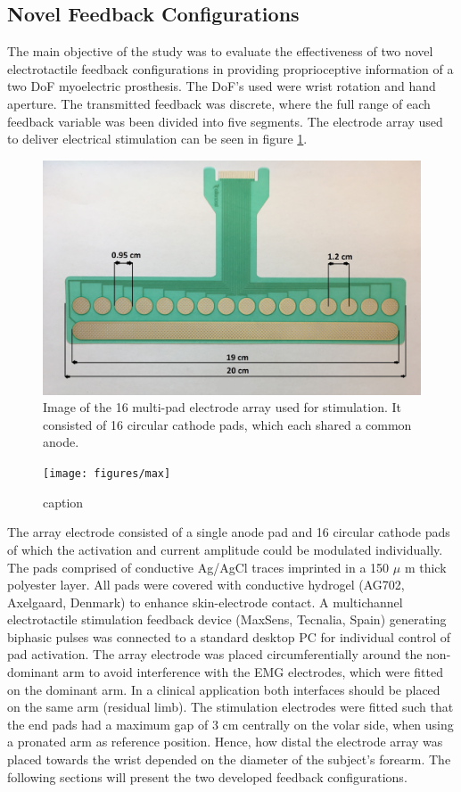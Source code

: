 \subsection{Novel Feedback Configurations}
The main objective of the study was to evaluate the effectiveness of two novel electrotactile feedback configurations in providing proprioceptive information of a two DoF myoelectric prosthesis. 
The DoF's used were wrist rotation and hand aperture. The transmitted feedback was discrete, where the full range of each feedback variable was been divided into five segments. The electrode array used to deliver electrical stimulation can be seen in figure \ref{fig:pa:electrode}.
\begin{figure}[H]                 
	\includegraphics[width=.95\textwidth]{figures/electrode}  
	\caption{Image of the 16 multi-pad electrode array used for stimulation. It consisted of 16 circular cathode pads, which each shared a common anode.}
	\label{fig:pa:electrode} 
\end{figure}
\begin{figure}[h]                 
	\texttt{[image: figures/max]}  
	\caption{caption}
	\label{fig:pa:max} 
\end{figure}   
The array electrode consisted of a single anode pad and 16 circular cathode pads of which the activation and current amplitude could be modulated individually. The pads comprised of conductive Ag/AgCl traces imprinted in a 150 $\mu$ m thick polyester layer. All pads were covered with conductive hydrogel (AG702, Axelgaard, Denmark) to enhance skin-electrode contact.  A multichannel electrotactile stimulation feedback device (MaxSens, Tecnalia, Spain) generating biphasic pulses was connected to a standard desktop PC for individual control of pad activation. The array electrode was placed circumferentially around the non-dominant arm to avoid interference with the EMG electrodes, which were fitted on the dominant arm. In a clinical application both interfaces should be placed on the same arm (residual limb). The stimulation electrodes were fitted such that the end pads had a maximum gap of 3 cm centrally on the volar side, when using a pronated arm as reference position. Hence, how distal the electrode array was placed towards the wrist depended on the diameter of the subject's forearm. The following sections will present the two developed feedback configurations. 



